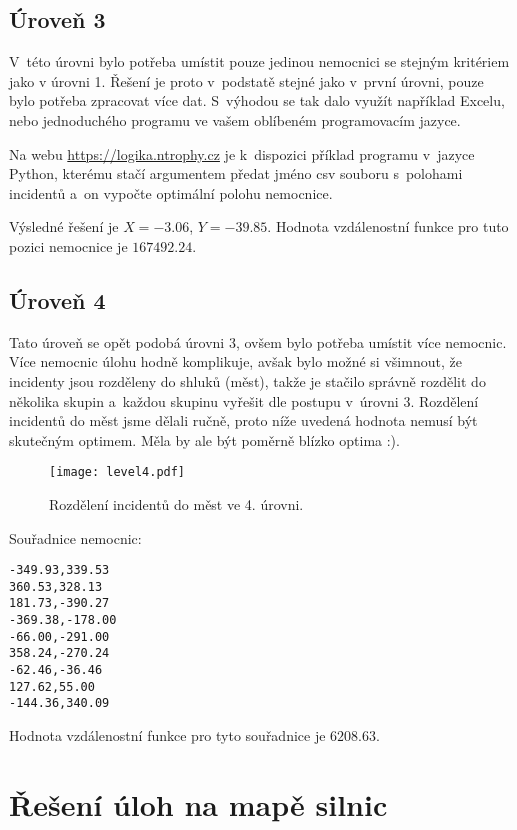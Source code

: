 \documentclass[12pt,a4paper]{article}
\begin{document}
\subsection*{Úroveň 3}
V~této úrovni bylo potřeba umístit pouze jedinou nemocnici se stejným kritériem
jako v úrovni 1. Řešení je proto v~podstatě stejné jako v~první úrovni, pouze
bylo potřeba zpracovat více dat. S~výhodou se tak dalo využít například Excelu,
nebo jednoduchého programu ve vašem oblíbeném programovacím jazyce.

Na webu \url{https://logika.ntrophy.cz} je k~dispozici příklad programu
v~jazyce Python, kterému stačí argumentem předat jméno csv souboru s~polohami
incidentů a~on vypočte optimální polohu nemocnice.

Výsledné řešení je $X=-3.06$, $Y=-39.85$. Hodnota vzdálenostní funkce pro tuto
pozici nemocnice je $167492.24$.

\subsection*{Úroveň 4}
Tato úroveň se opět podobá úrovni 3, ovšem bylo potřeba umístit více nemocnic.
Více nemocnic úlohu hodně komplikuje, avšak bylo možné si všimnout, že
incidenty jsou rozděleny do shluků (měst), takže je stačilo správně rozdělit do
několika skupin a~každou skupinu vyřešit dle postupu v~úrovni 3. Rozdělení
incidentů do měst jsme dělali ručně, proto níže uvedená hodnota nemusí být
skutečným optimem. Měla by ale být poměrně blízko optima :).

\begin{figure}[ht]
\centering
\texttt{[image: level4.pdf]}
\caption{Rozdělení incidentů do měst ve 4. úrovni.}
\end{figure}

Souřadnice nemocnic:
\begin{verbatim}
-349.93,339.53
360.53,328.13
181.73,-390.27
-369.38,-178.00
-66.00,-291.00
358.24,-270.24
-62.46,-36.46
127.62,55.00
-144.36,340.09
\end{verbatim}

Hodnota vzdálenostní funkce pro tyto souřadnice je $6208.63$.

\section*{Řešení úloh na mapě silnic}
\end{document}
